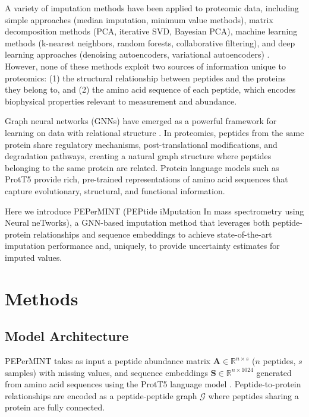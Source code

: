 \documentclass[12pt]{article}
\begin{document}
A variety of imputation methods have been applied to proteomic data, including simple approaches (median imputation, minimum value methods), matrix decomposition methods (PCA, iterative SVD, Bayesian PCA), machine learning methods (k-nearest neighbors, random forests, collaborative filtering), and deep learning approaches (denoising autoencoders, variational autoencoders) \citep{troyanskaya2001missing, oba2003bayesian, stekhoven2012missforest, kingma2013auto}. However, none of these methods exploit two sources of information unique to proteomics: (1) the structural relationship between peptides and the proteins they belong to, and (2) the amino acid sequence of each peptide, which encodes biophysical properties relevant to measurement and abundance.

Graph neural networks (GNNs) have emerged as a powerful framework for learning on data with relational structure \citep{velickovic2023graph, velickovic2018graph}. In proteomics, peptides from the same protein share regulatory mechanisms, post-translational modifications, and degradation pathways, creating a natural graph structure where peptides belonging to the same protein are related. Protein language models such as ProtT5 \citep{elnaggar2021prottrans} provide rich, pre-trained representations of amino acid sequences that capture evolutionary, structural, and functional information.

Here we introduce PEPerMINT (PEPtide iMputation In mass spectrometry using Neural neTworks), a GNN-based imputation method that leverages both peptide-protein relationships and sequence embeddings to achieve state-of-the-art imputation performance and, uniquely, to provide uncertainty estimates for imputed values.

\section{Methods}

\subsection{Model Architecture}

PEPerMINT takes as input a peptide abundance matrix $\mathbf{A} \in \mathbb{R}^{n \times s}$ ($n$ peptides, $s$ samples) with missing values, and sequence embeddings $\mathbf{S} \in \mathbb{R}^{n \times 1024}$ generated from amino acid sequences using the ProtT5 language model \citep{elnaggar2021prottrans}. Peptide-to-protein relationships are encoded as a peptide-peptide graph $\mathcal{G}$ where peptides sharing a protein are fully connected.
\end{document}
